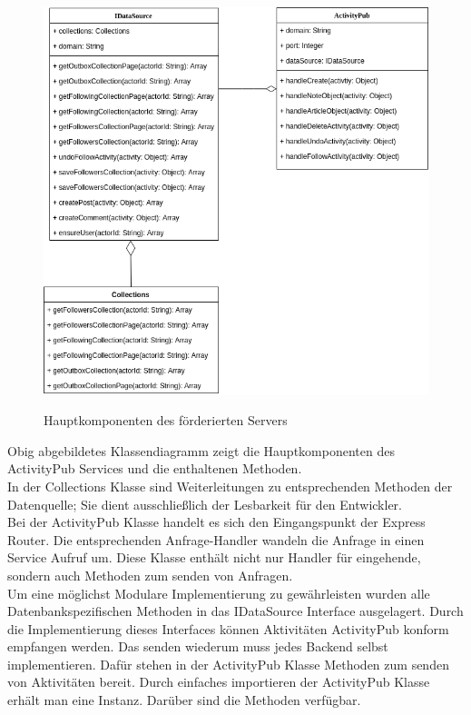 \begin{figure}[h]
	\begin{minipage}{\textwidth}
		\centering
		\includegraphics[scale=0.6]{figures/klassendiagramm-activitypub.png}
		\label{klassendiagramm-activitypub}
		\caption{Hauptkomponenten des förderierten Servers}
	\end{minipage}
\end{figure}
Obig abgebildetes Klassendiagramm zeigt die Hauptkomponenten des ActivityPub Services und die enthaltenen Methoden.\\
In der Collections Klasse sind Weiterleitungen zu entsprechenden Methoden der Datenquelle; Sie dient ausschließlich der Lesbarkeit für den Entwickler.\\
Bei der ActivityPub Klasse handelt es sich den Eingangspunkt der Express Router. Die entsprechenden Anfrage-Handler wandeln die Anfrage in einen Service Aufruf um. Diese Klasse enthält nicht nur Handler für eingehende, sondern auch Methoden zum senden von Anfragen.\\

Um eine möglichst Modulare Implementierung zu gewährleisten wurden alle Datenbankspezifischen Methoden in das IDataSource Interface ausgelagert. Durch die Implementierung dieses Interfaces können Aktivitäten ActivityPub konform empfangen werden. Das senden wiederum muss jedes Backend selbst implementieren. Dafür stehen in der ActivityPub Klasse Methoden zum senden von Aktivitäten bereit. Durch einfaches importieren der ActivityPub Klasse erhält man eine Instanz. Darüber sind die Methoden verfügbar.\\


